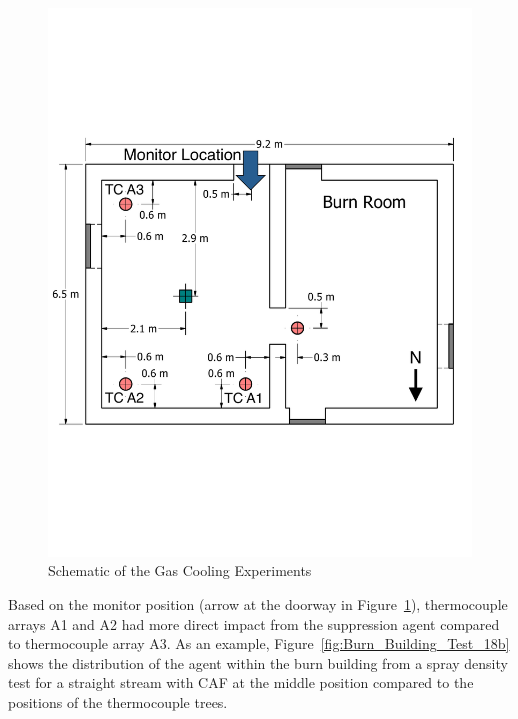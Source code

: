\documentclass[12pt,oneside]{book}
\begin{document}
\begin{figure}[!ht]
	\includegraphics[width=\columnwidth]{../Figures/Floor_Plans/PDFs/West_Structure/DelCo_2012_West_Structure_Instrumentation2}
	\caption{Schematic of  the Gas Cooling Experiments}
	\label{fig:Gas_Cooling_Instrumentation_Dimensions2}
\end{figure}

Based on the monitor position (arrow at the doorway in Figure~\ref{fig:Gas_Cooling_Instrumentation_Dimensions2}), thermocouple arrays A1 and A2 had more direct impact from the suppression agent compared to thermocouple array A3. As an example, Figure~\ref{fig:Burn_Building_Test_18b} shows the distribution of the agent within the burn building from a spray density test for a straight stream with CAF at the middle position compared to the positions of the thermocouple trees.
\end{document}
